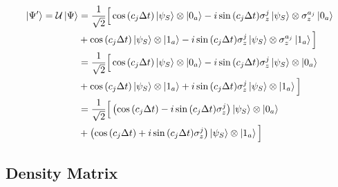 \documentclass[a4paper,12pt]{article}
\begin{document}
	\begin{align}
		\ket{\Psi'} = \mathcal{U} \ket{\Psi}
		&= \frac{1}{\sqrt{2}} \Big[ \cos{\left(c_j \Delta t\right)} \ket{\psi_{S}} \otimes \ket{0_a} - i\sin{\left(c_j \Delta t \right)} \sigma_{z}^{j} \ket{\psi_{S}} \otimes \sigma_{z}^{a_j}\ket{0_a} \notag \\
		& + \cos{\left(c_j \Delta t\right)} \ket{\psi_{S}} \otimes \ket{1_a} - i\sin{\left(c_j \Delta t \right)} \sigma_{z}^{j} \ket{\psi_{S}} \otimes \sigma_{z}^{a_j}\ket{1_a} \Big] \notag \\
		&= \frac{1}{\sqrt{2}} \Big[ \cos{\left(c_j \Delta t\right)} \ket{\psi_{S}} \otimes \ket{0_a} - i\sin{\left(c_j \Delta t \right)} \sigma_{z}^{j} \ket{\psi_{S}} \otimes \ket{0_a} \notag \\
		& + \cos{\left(c_j \Delta t\right)} \ket{\psi_{S}} \otimes \ket{1_a} + i\sin{\left(c_j \Delta t \right)} \sigma_{z}^{j} \ket{\psi_{S}} \otimes \ket{1_a} \Big] \notag \\
		&= \frac{1}{\sqrt{2}} \Big[ \left( \cos{\left(c_j \Delta t\right)} - i\sin{\left(c_j \Delta t \right)} \sigma_{z}^{j}\right) \ket{\psi_{S}} \otimes \ket{0_a}  \notag \\
		& + \left( \cos{\left(c_j \Delta t\right)} + i\sin{\left(c_j \Delta t \right)}  \sigma_{z}^{j}\right) \ket{\psi_{S}} \otimes \ket{1_a}  \Big]
		\label{eq:psi_evo_cohe}
	\end{align}

	\subsection{Density Matrix}
	\label{sub:Density_Matrix_Reconstruction_cohe}
\end{document}
